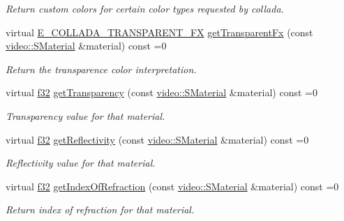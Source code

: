\begin{DoxyCompactItemize}
\begin{DoxyCompactList}\small\item\em Return custom colors for certain color types requested by collada. \end{DoxyCompactList}\item 
virtual \hyperlink{namespaceirr_1_1scene_af7dadd5b96b683cfe1800f343c4f6619}{E\+\_\+\+C\+O\+L\+L\+A\+D\+A\+\_\+\+T\+R\+A\+N\+S\+P\+A\+R\+E\+N\+T\+\_\+\+FX} \hyperlink{classirr_1_1scene_1_1IColladaMeshWriterProperties_a0d934ae86d3e587ae22f74d775bbfa36}{get\+Transparent\+Fx} (const \hyperlink{classirr_1_1video_1_1SMaterial}{video\+::\+S\+Material} \&material) const =0
\begin{DoxyCompactList}\small\item\em Return the transparence color interpretation. \end{DoxyCompactList}\item 
virtual \hyperlink{namespaceirr_a0277be98d67dc26ff93b1a6a1d086b07}{f32} \hyperlink{classirr_1_1scene_1_1IColladaMeshWriterProperties_ac547e1f89f4655751ecd570ad70d010b}{get\+Transparency} (const \hyperlink{classirr_1_1video_1_1SMaterial}{video\+::\+S\+Material} \&material) const =0
\begin{DoxyCompactList}\small\item\em Transparency value for that material. \end{DoxyCompactList}\item 
virtual \hyperlink{namespaceirr_a0277be98d67dc26ff93b1a6a1d086b07}{f32} \hyperlink{classirr_1_1scene_1_1IColladaMeshWriterProperties_ad880b5fc91114049b20347a31199b2a9}{get\+Reflectivity} (const \hyperlink{classirr_1_1video_1_1SMaterial}{video\+::\+S\+Material} \&material) const =0
\begin{DoxyCompactList}\small\item\em Reflectivity value for that material. \end{DoxyCompactList}\item 
virtual \hyperlink{namespaceirr_a0277be98d67dc26ff93b1a6a1d086b07}{f32} \hyperlink{classirr_1_1scene_1_1IColladaMeshWriterProperties_ab7ec58f708ebebe941246e6c78b0691d}{get\+Index\+Of\+Refraction} (const \hyperlink{classirr_1_1video_1_1SMaterial}{video\+::\+S\+Material} \&material) const =0
\begin{DoxyCompactList}\small\item\em Return index of refraction for that material. \end{DoxyCompactList}\item 
\mbox{\label{classirr_1_1scene_1_1IColladaMeshWriterProperties_af24d1c12b3f4168407c078bd7fc3dc82}} 

\end{DoxyCompactItemize}
